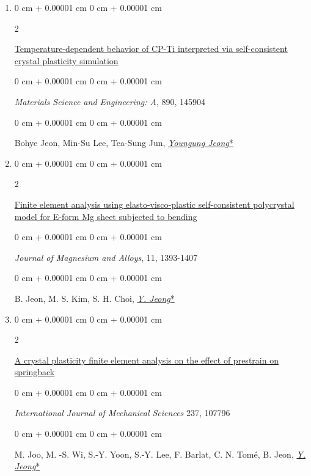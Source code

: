 \documentclass[10pt, letterpaper]{article}
\newenvironment{onecolentry}{
    \begin{adjustwidth}{
        0 cm + 0.00001 cm
    }{
        0 cm + 0.00001 cm
    }
}{
    \end{adjustwidth}
} %
\newenvironment{twocolentry}[2][]{
    \onecolentry
    \def\secondColumn{#2}
    \setcolumnwidth{\fill, 4.5 cm}
    \begin{paracol}{2}
}{
    \switchcolumn \raggedleft \secondColumn
    \end{paracol}
    \endonecolentry
} %
\begin{document}
\begin{enumerate}
        \item
        \begin{twocolentry}{2024}
            \href{https://doi.org/10.1016/j.msea.2023.145904}{Temperature-dependent behavior of CP-Ti interpreted via self-consistent crystal plasticity simulation}
        \end{twocolentry}
        \begin{onecolentry}
            {\it Materials Science and Engineering: A}, 890, 145904
        \end{onecolentry}
        \begin{onecolentry}
            Bohye Jeon, Min-Su Lee, Tea-Sung Jun, {\underline{\textit{Youngung Jeong}*}}
        \end{onecolentry}
        \vspace{0.10 cm}

        \item
        \begin{twocolentry}{2023}
            \href{https://doi.org/10.1016/j.jma.2022.10.017}{Finite element analysis using elasto-visco-plastic self-consistent polycrystal model for E-form Mg sheet subjected to bending}
        \end{twocolentry}
        \begin{onecolentry}
            {\it Journal of Magnesium and Alloys}, 11, 1393-1407
        \end{onecolentry}
        \begin{onecolentry}
            B. Jeon, M. S. Kim, S. H. Choi, {\underline{\textit{Y. Jeong}*}}
        \end{onecolentry}
        \vspace{0.10 cm}

        \item
        \begin{twocolentry}{2023}
            \href{https://doi.org/10.1016/j.ijmecsci.2022.107796}{A crystal plasticity finite element analysis on the effect of prestrain on springback}
        \end{twocolentry}
        \begin{onecolentry}
            {\it International Journal of Mechanical Sciences} 237, 107796
        \end{onecolentry}
        \begin{onecolentry}
            M. Joo, M. -S. Wi, S.-Y. Yoon, S.-Y. Lee, F. Barlat, C. N. Tomé, B. Jeon, {\underline{\textit{Y. Jeong}*}}
        \end{onecolentry}
        \vspace{0.10 cm}



\end{enumerate}
\end{document}
